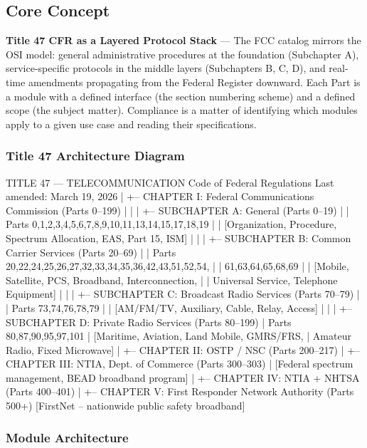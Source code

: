 \documentclass[11pt,letterpaper]{article}
\begin{document}
\subsection{Core Concept}

\textbf{Title 47 CFR as a Layered Protocol Stack} --- The FCC catalog mirrors the OSI model: general administrative procedures at the foundation (Subchapter A), service-specific protocols in the middle layers (Subchapters B, C, D), and real-time amendments propagating from the Federal Register downward. Each Part is a module with a defined interface (the section numbering scheme) and a defined scope (the subject matter). Compliance is a matter of identifying which modules apply to a given use case and reading their specifications.

\subsubsection{Title 47 Architecture Diagram}

\begin{asciibox}
TITLE 47 --- TELECOMMUNICATION
Code of Federal Regulations
Last amended: March 19, 2026
|
+-- CHAPTER I: Federal Communications Commission (Parts 0--199)
|   |
|   +-- SUBCHAPTER A: General (Parts 0--19)
|   |   Parts 0,1,2,3,4,5,6,7,8,9,10,11,13,14,15,17,18,19
|   |   [Organization, Procedure, Spectrum Allocation, EAS, Part 15, ISM]
|   |
|   +-- SUBCHAPTER B: Common Carrier Services (Parts 20--69)
|   |   Parts 20,22,24,25,26,27,32,33,34,35,36,42,43,51,52,54,
|   |          61,63,64,65,68,69
|   |   [Mobile, Satellite, PCS, Broadband, Interconnection,
|   |    Universal Service, Telephone Equipment]
|   |
|   +-- SUBCHAPTER C: Broadcast Radio Services (Parts 70--79)
|   |   Parts 73,74,76,78,79
|   |   [AM/FM/TV, Auxiliary, Cable, Relay, Access]
|   |
|   +-- SUBCHAPTER D: Private Radio Services (Parts 80--199)
|       Parts 80,87,90,95,97,101
|       [Maritime, Aviation, Land Mobile, GMRS/FRS,
|        Amateur Radio, Fixed Microwave]
|
+-- CHAPTER II: OSTP / NSC (Parts 200--217)
|
+-- CHAPTER III: NTIA, Dept. of Commerce (Parts 300--303)
|   [Federal spectrum management, BEAD broadband program]
|
+-- CHAPTER IV: NTIA + NHTSA (Parts 400--401)
|
+-- CHAPTER V: First Responder Network Authority (Parts 500+)
    [FirstNet -- nationwide public safety broadband]
\end{asciibox}

\subsubsection{Module Architecture}
\end{document}
